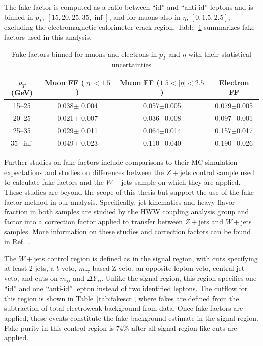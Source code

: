 The fake factor is computed as a ratio between ``id'' and ``anti-id'' leptons and is binned in $p_T$, $[15,20,25,35,\inf]$, and for muons also in $\eta$, $[0,1.5,2.5]$, excluding the electromagnetic calorimeter crack region. Table~\ref{tab:FakeFactors} summarizes fake factors used in this analysis.

\begin{table}[tb]
\centering
\begin{tabular}{c|c|c|c}
$p_T$(GeV) & Muon FF ($|\eta|<1.5$) & Muon FF ($1.5<|\eta|<2.5$) & Electron FF \\
\hline
15--25 & 0.038$\pm$ 0.004 & 0.057$\pm$0.005 & 0.079$\pm$0.005 \\
20--25 & 0.021$\pm$ 0.007 & 0.036$\pm$0.008 & 0.097$\pm$0.001 \\
25--35 & 0.029$\pm$ 0.011 & 0.064$\pm$0.014 & 0.157$\pm$0.017 \\
35--$\inf$ & 0.049$\pm$ 0.023 & 0.110$\pm$0.040 & 0.190$\pm$0.026 \\
\end{tabular}
\caption{Fake factors binned for muons and electrons in $p_T$ and $\eta$ with their statistical uncertainties}
\label{tab:FakeFactors}
\end{table}

Further studies on fake factors include comparisons to their MC simulation expectations and studies on differences between the $Z+$jets control sample used to calculate fake factors and the $W+$jets sample on which they are applied. These studies are beyond the scope of this thesis but support the use of the fake factor method in our analysis. Specifically, jet kinematics and heavy flavor fraction in both samples are studied by the HWW coupling analysis group and factor into a correction factor applied to transfer between $Z+$jets and $W+$jets samples. More information on these studies and correction factors can be found in Ref.~\cite{Aaboud_2019}.

The $W+$jets control region is defined as in the signal region, with cuts specifying at least 2 jets, a $b$-veto, $m_{\tau\tau}$ based Z-veto, an opposite lepton veto, central jet veto, and cuts on $m_{jj}$ and $\Delta Y_{jj}$. Unlike the signal region, this region specifies one ``id'' and one ``anti-id'' lepton instead of two identified leptons. The cutflow for this region is shown in Table~\ref{tab:fakescr}, where fakes are defined from the subtraction of total electroweak background from data. Once fake factors are applied, these events constitute the fake background estimate in the signal region. Fake purity in this control region is $74\%$ after all signal region-like cuts are applied.

